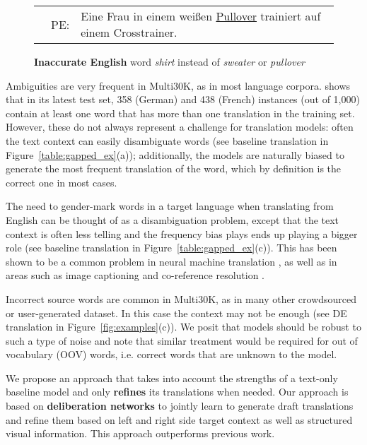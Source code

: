 \documentclass[11pt,a4paper]{article}
\begin{document}
\begin{figure*}[t]
{\begin{subfigure}[c]{\textwidth}
\begin{tabular}{c p{0.3cm}p{11cm}}
      & PE: & Eine Frau in einem wei{\ss}en \underline{Pullover} trainiert auf einem Crosstrainer.\\[1ex]
  \end{tabular}
  \vspace{3em}
  \caption{\textbf{Inaccurate English} word {\em shirt} instead of {\em sweater} or {\em pullover}}
  \end{subfigure}}
\caption{Examples of lexical and gender ambiguity, and inaccurate English description where post-edits (PE) required the image to correct human translation from English (EN) to German (DE).}\label{fig:examples}
\end{figure*}

Ambiguities are very frequent in Multi30K, as in most language corpora.  shows that in its latest test set, 358 (German) and 438 (French) instances (out of 1,000) contain at least one word that has more than one translation in the training set. However, these do not always represent a challenge for translation models: often the text context can easily disambiguate words (see baseline translation in Figure~\ref{table:gapped_ex}(a)); additionally, the models are naturally biased to generate the most frequent translation of the word, which by definition  is the correct one in most cases. 

The need to gender-mark words in a target language when translating from English can be thought of as a disambiguation problem, except that the text context is often less telling and the frequency bias plays ends up playing a bigger role (see baseline translation  in Figure~\ref{table:gapped_ex}(c)). This has been shown to be a common problem in neural machine translation \cite{D18-1334,DBLP:journals/corr/abs-1901-03116}, as well as in areas such as image captioning \cite{snowboard:2018} and co-reference resolution \cite{N18-2003}.  

Incorrect source words are common in Multi30K, as in many other crowdsourced or user-generated dataset. In this case the context may not be enough (see DE translation  in Figure~\ref{fig:examples}(c)). We posit that models should be robust to such a type of noise and note that similar treatment would be required for out of vocabulary (OOV) words, i.e. correct words that are unknown to the model. 

We propose an approach that takes into account the strengths of a text-only baseline model and only {\bf refines} its translations when needed. Our approach is based on {\bf deliberation networks} \cite{xia2017deliberation} to jointly learn to generate draft translations and refine them based on left and right side target context as well as structured visual information. This approach outperforms previous work. 
\end{document}

